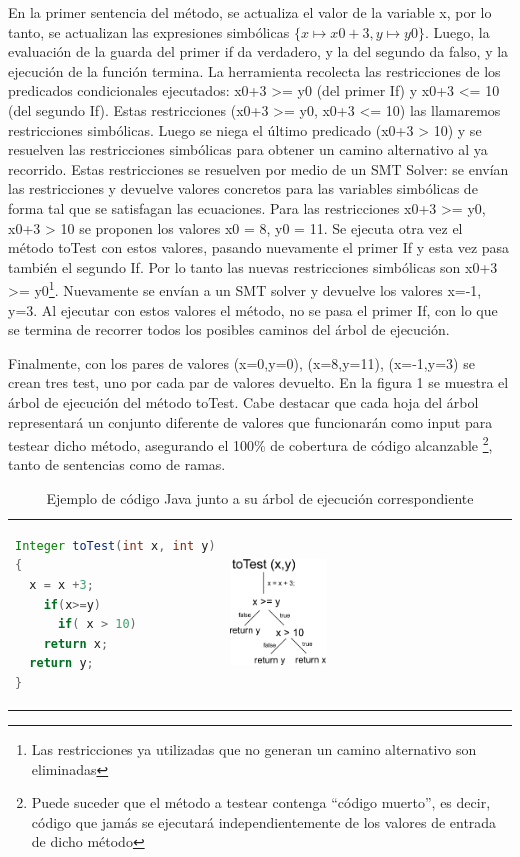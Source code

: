 \documentclass{llncs}
\begin{document}
En la primer sentencia del método, se actualiza el valor de la variable x, por lo tanto, se actualizan las expresiones simbólicas \(\{x\mapsto x0+3,y\mapsto y0\}\). Luego, la evaluación de la guarda del primer if da verdadero, y la del segundo da falso, y la ejecución de la función termina. La herramienta recolecta las restricciones de los predicados condicionales ejecutados: x0+3 >= y0 (del primer If) y x0+3 <= 10 (del segundo If). Estas restricciones (x0+3 >= y0, x0+3 <= 10) las llamaremos restricciones simbólicas.
Luego se niega el último predicado (x0+3 > 10) y se resuelven las restricciones simbólicas para obtener un camino alternativo al ya recorrido.
Estas restricciones se resuelven por medio de un SMT Solver: se envían las restricciones y devuelve valores concretos para las variables simbólicas
de forma tal que se satisfagan las ecuaciones. Para las restricciones x0+3 >= y0, x0+3 > 10 se proponen los valores x0 = 8, y0 = 11.
Se ejecuta otra vez el método toTest con estos valores, pasando nuevamente el primer If y esta vez pasa también el segundo If.
Por lo tanto las nuevas restricciones simbólicas son x0+3 >= y0\footnote{Las restricciones ya utilizadas que no generan un camino alternativo son eliminadas}.
Nuevamente se envían a un SMT solver y devuelve los valores x=-1, y=3.
Al ejecutar con estos valores el método, no se pasa el primer If, con lo que se termina de recorrer todos los posibles caminos del árbol de ejecución.

Finalmente, con los pares de valores {(x=0,y=0), (x=8,y=11), (x=-1,y=3)} se crean tres test, uno por cada par de valores devuelto. En la figura 1 se muestra el árbol de ejecución del método toTest.
Cabe destacar que cada hoja del árbol representará un conjunto diferente de valores que funcionarán como input para testear dicho método,
asegurando el 100\% de cobertura de código alcanzable \footnote{Puede suceder que el método a testear contenga “código muerto”, es decir, código que jamás se ejecutará independientemente de los valores de entrada de dicho método}, tanto de sentencias como de ramas.


\begin{table}
\centering
\begin{tabular}{>{\centering}m{6cm} m{5cm}}
\begin{lstlisting}[language=Java]
Integer toTest(int x, int y)
{
  x = x +3;
    if(x>=y) 
      if( x > 10) 
	return x;
  return y;
}
\end{lstlisting} & 
\includegraphics[width=0.35\textwidth]{arbolEjecucion}
\end{tabular}
\caption{Ejemplo de código Java junto a su árbol de ejecución correspondiente}
\label{arbolEjecucion}
\end{table}
\end{document}
